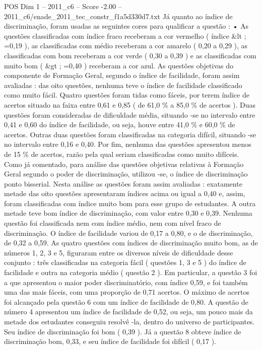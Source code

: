 \begin{textsample}{POS Dim 1 – 2011\_c6 – Score -2.00 – 2011\_c6/enade\_2011\_tec\_constr\_f1a5d330d7.txt}
Já quanto ao índice de discriminação, foram usadas as seguintes cores para qualificar a questão : • As questões classificadas com índice fraco receberam a cor vermelho ( índice \&lt ; =0,19 ), as classificadas com médio receberam a cor amarelo ( 0,20 a 0,29 ), as classificadas com bom receberam a cor verde ( 0,30 a 0,39 ) e as classificadas com muito bom ( \&gt ; =0,40 ) receberam a cor azul.
As questões objetivas do componente de Formação Geral, segundo o índice de facilidade, foram assim avaliadas : das oito questões, nenhuma teve o índice de facilidade classificado como muito fácil.
Quatro questões foram tidas como fáceis, por terem índice de acertos situado na faixa entre 0,61 e 0,85 ( de 61,0 \% a 85,0 \% de acertos ).
Duas questões foram consideradas de dificuldade média, situando -se no intervalo entre 0,41 e 0,60 do índice de facilidade, ou seja, houve entre 41,0 \% e 60,0 \% de acertos.
Outras duas questões foram classificadas na categoria difícil, situando -se no intervalo entre 0,16 e 0,40.
Por fim, nenhuma das questões apresentou menos de 15 \% de acertos, razão pela qual seriam classificadas como muito difíceis.
Como já comentado, para análise das questões objetivas relativas à Formação Geral segundo o poder de discriminação, utilizou -se, o índice de discriminação ponto bisserial.
Nesta análise as questões foram assim avaliadas : exatamente metade das oito questões apresentaram índices acima ou igual a 0,40 e, assim, foram classificadas com índice muito bom para esse grupo de estudantes.
A outra metade teve bom índice de discriminação, com valor entre 0,30 e 0,39.
Nenhuma questão foi classificada nem com índice médio, nem com nível fraco de discriminação.
O índice de facilidade variou de 0,17 a 0,80, e o de discriminação, de 0,32 a 0,59.
As quatro questões com índices de discriminação muito bom, as de números 1, 2, 3 e 5, figuraram entre os diversos níveis de dificuldade desse conjunto : três classificadas na categoria fácil ( questões 1, 3 e 5 ) do índice de facilidade e outra na categoria médio ( questão 2 ).
Em particular, a questão 3 foi a que apresentou o maior poder discriminatório, com índice 0,59, e foi também uma das mais fáceis, com uma proporção de 0,71 acertos.
O máximo de acertos foi alcançado pela questão 6 com um índice de facilidade de 0,80.
A questão de número 4 apresentou um índice de facilidade de 0,52, ou seja, um pouco mais da metade dos estudantes conseguiu resolvê -la, dentro do universo de participantes.
Seu índice de discriminação foi bom ( 0,39 ).
Já a questão 8 obteve índice de discriminação bom, 0,33, e seu índice de facilidade foi difícil ( 0,17 ).

\end{textsample}
